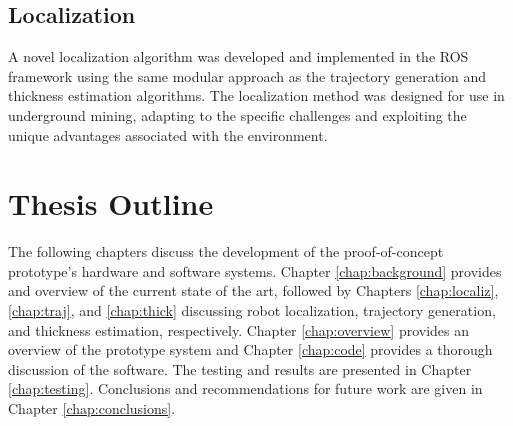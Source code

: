 \subsection{Localization}
A novel localization algorithm was developed and implemented in the ROS framework using the same modular approach as the trajectory generation and thickness estimation algorithms. The localization method was designed for use in underground mining, adapting to the specific challenges and exploiting the unique advantages associated with the environment.\\

\section{Thesis Outline}
\label{sec:outline}

The following chapters discuss the development of the proof-of-concept prototype's hardware and software systems. Chapter \ref{chap:background} provides and overview of the current state of the art, followed by Chapters \ref{chap:localiz}, \ref{chap:traj}, and \ref{chap:thick} discussing robot localization, trajectory generation, and thickness estimation, respectively. Chapter \ref{chap:overview} provides an overview of the prototype system and Chapter \ref{chap:code} provides a thorough discussion of the software. The testing and results are presented in Chapter \ref{chap:testing}. Conclusions and recommendations for future work are given in Chapter \ref{chap:conclusions}.\\